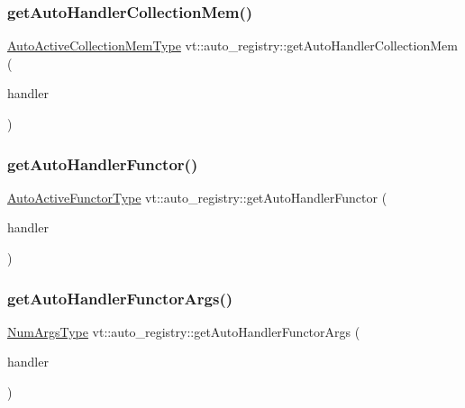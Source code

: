 \subsubsection{\texorpdfstring{get\+Auto\+Handler\+Collection\+Mem()}{getAutoHandlerCollectionMem()}}
{\footnotesize\ttfamily \hyperlink{namespacevt_1_1auto__registry_aa217123c03472f9bcee51300d638b16e}{Auto\+Active\+Collection\+Mem\+Type} vt\+::auto\+\_\+registry\+::get\+Auto\+Handler\+Collection\+Mem (\begin{DoxyParamCaption}\item[{\hyperlink{namespacevt_af64846b57dfcaf104da3ef6967917573}{Handler\+Type} const \&}]{handler }\end{DoxyParamCaption})\hspace{0.3cm}{\ttfamily [inline]}}

\mbox{\label{namespacevt_1_1auto__registry_ac5906cc1ef94ef7e40eb4416d5acb9d5}} 
\subsubsection{\texorpdfstring{get\+Auto\+Handler\+Functor()}{getAutoHandlerFunctor()}}
{\footnotesize\ttfamily \hyperlink{namespacevt_1_1auto__registry_a0efe8e4e502d6a88a8eb50d7d909228d}{Auto\+Active\+Functor\+Type} vt\+::auto\+\_\+registry\+::get\+Auto\+Handler\+Functor (\begin{DoxyParamCaption}\item[{\hyperlink{namespacevt_af64846b57dfcaf104da3ef6967917573}{Handler\+Type} const \&}]{handler }\end{DoxyParamCaption})\hspace{0.3cm}{\ttfamily [inline]}}

\mbox{\label{namespacevt_1_1auto__registry_ae68422e2a7b216e19bc16988400b0d47}} 
\subsubsection{\texorpdfstring{get\+Auto\+Handler\+Functor\+Args()}{getAutoHandlerFunctorArgs()}}
{\footnotesize\ttfamily \hyperlink{namespacevt_1_1auto__registry_aebda1d9d765bc9147dc654ad0712c936}{Num\+Args\+Type} vt\+::auto\+\_\+registry\+::get\+Auto\+Handler\+Functor\+Args (\begin{DoxyParamCaption}\item[{\hyperlink{namespacevt_af64846b57dfcaf104da3ef6967917573}{Handler\+Type} const \&}]{handler }\end{DoxyParamCaption})\hspace{0.3cm}{\ttfamily [inline]}}

